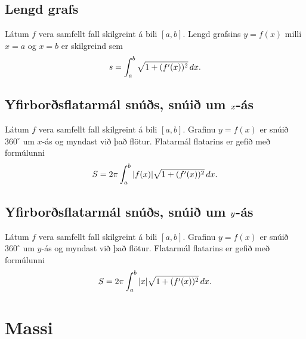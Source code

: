 \documentclass[a4paper,10pt,icelandic]{sphinxmanual}
\begin{document}
\subsection{Lengd grafs}
\label{kafli07:lengd-grafs}
Látum \(f\) vera samfellt fall skilgreint á bili \([a, b]\).
Lengd grafsins \(y=f(x)\) milli \(x=a\) og \(x=b\) er
skilgreind sem
\begin{gather}
\begin{split}s=\int_a^b\sqrt{1+(f'(x))^2}\,dx.\end{split}\notag
\end{gather}

\subsection{Yfirborðsflatarmál snúðs, snúið um \protect\(x\protect\)-ás}
\label{kafli07:yfirborsflatarmal-snus-snui-um-as}\label{kafli07:index-7}
Látum \(f\) vera samfellt fall skilgreint á bili \([a, b]\).
Grafinu \(y=f(x)\) er snúið \(360^\circ\) um \(x\)-ás og
myndast við það flötur. Flatarmál flatarins er gefið með formúlunni
\begin{gather}
\begin{split}S=2\pi\int_a^b|f(x)|\sqrt{1+(f'(x))^2}\,dx.\end{split}\notag
\end{gather}

\subsection{Yfirborðsflatarmál snúðs, snúið um \protect\(y\protect\)-ás}
\label{kafli07:index-8}\label{kafli07:id3}
Látum \(f\) vera samfellt fall skilgreint á bili \([a, b]\).
Grafinu \(y=f(x)\) er snúið \(360^\circ\) um \(y\)-ás og
myndast við það flötur. Flatarmál flatarins er gefið með formúlunni
\begin{gather}
\begin{split}S=2\pi\int_a^b|x|\sqrt{1+(f'(x))^2}\,dx.\end{split}\notag
\end{gather}

\section{Massi}
\label{kafli07:index-9}\label{kafli07:massi}
\end{document}
